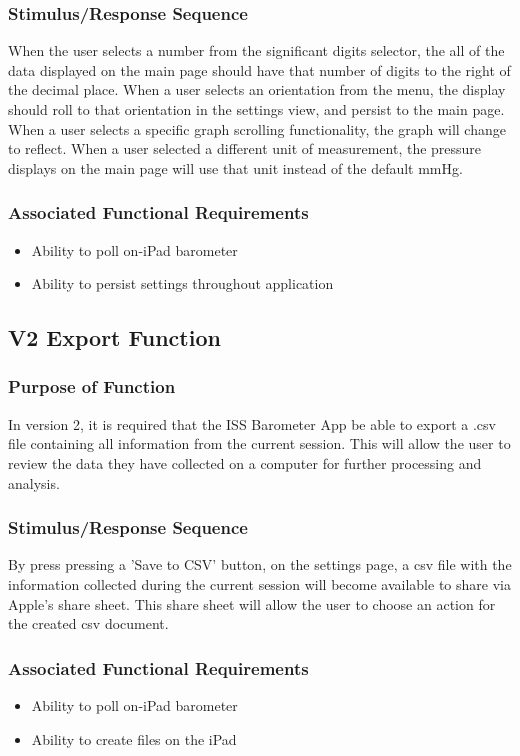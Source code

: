 \documentclass[onecolumn, draftclsnofoot,10pt, compsoc]{IEEEtran}
\def \CapstoneProjectName{ISS Barometer App }
\begin{document}
\subsubsection{Stimulus/Response Sequence}
When the user selects a number from the significant digits selector, the all of the data displayed on the main page should have that number of digits to the right of the decimal place.
When a user selects an orientation from the menu, the display should roll to that orientation in the settings view, and persist to the main page.
When a user selects a specific graph scrolling functionality, the graph will change to reflect.
When a user selected a different unit of measurement, the pressure displays on the main page will use that unit instead of the default mmHg.

\subsubsection{Associated Functional Requirements}
\begin{itemize}
\item Ability to poll on-iPad barometer
\item Ability to persist settings throughout application
\end{itemize}


\subsection{V2 Export Function}
\subsubsection{Purpose of Function}
In version 2, it is required that the \CapstoneProjectName be able to export a .csv file containing all information from the current session.
This will allow the user to review the data they have collected on a computer for further processing and analysis.
\subsubsection{Stimulus/Response Sequence}
By press pressing a 'Save to CSV' button, on the settings page, a csv file with the information collected during the current session will become available to share via Apple's share sheet.
This share sheet will allow the user to choose an action for the created csv document.
\subsubsection{Associated Functional Requirements}
\begin{itemize}
\item Ability to poll on-iPad barometer
\item Ability to create files on the iPad
\end{itemize}
\end{document}
